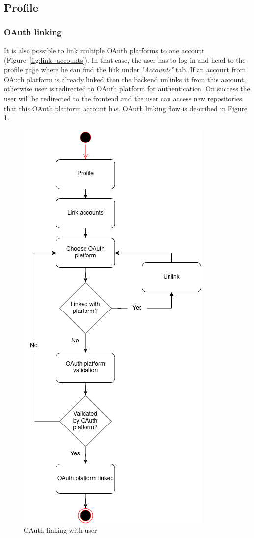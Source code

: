 \subsection{Profile}\label{subsec:profile}
\subsubsection{OAuth linking}\label{subsubsec:oauth-linking}
It is also possible to link multiple OAuth platforms to one account (Figure~\ref{fig:link_accounts}).
In that case, the user has to log in and head to the profile page where he can find the link  under \textit{"Accounts"} tab.
If an account from OAuth platform is already linked then the backend unlinks it from this account, otherwise user is redirected to OAuth platform for authentication.
On success the user will be redirected to the frontend and the user can access new repositories that this OAuth platform account has.
OAuth linking flow is described in Figure
\ref{fig:account-linking}.

\begin{figure}[H]
    \centering
    \includegraphics[width=0.5\linewidth]{figures/oauth_linking_user_flow}
    \caption{OAuth linking with user}
    \label{fig:account-linking}
\end{figure}

